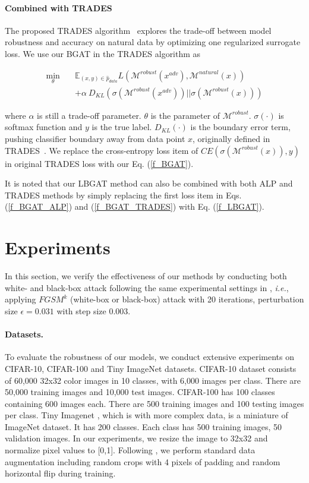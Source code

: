 \documentclass[10pt,twocolumn,letterpaper]{article}
\begin{document}
\paragraph{Combined with TRADES}
The proposed TRADES algorithm~\cite{zhang2019theoretically} explores the trade-off between model robustness and accuracy on natural data by optimizing one regularized surrogate loss. We use our BGAT in the TRADES algorithm as
\begin{small}
	\begin{align}
	\mathop{\min}_{\theta} \quad & \mathbb{E}_{(x,y) \in \hat{p}_{data}} L\left(\mathcal{M}^{robust}(x^{adv}), \mathcal{M}^{natural}(x)\right) \nonumber \\
	&+ \alpha~D_{KL}\left(\sigma(\mathcal{M}^{robust}(x^{adv})) || \sigma(\mathcal{M}^{robust}(x))\right) \label{f_BGAT_TRADES}
	\end{align}
\end{small}
where $\alpha$ is still a trade-off parameter.  $\theta$ is the parameter of $\mathcal{M}^{robust}$. $\sigma(\cdot)$ is softmax function and $y$ is the true label. $D_{KL}(\cdot)$ is the boundary error term, pushing classifier boundary away from data point $x$, originally defined in TRADES~\cite{zhang2019theoretically}. We replace the cross-entropy loss item of  $CE(\sigma(\mathcal{M}^{robust}(x)),y)$ in original TRADES loss with our Eq. (\ref{f_BGAT}). 


It is noted that our LBGAT method can also be combined with both ALP and TRADES methods by simply replacing the first loss item in Eqs. (\ref{f_BGAT_ALP}) and (\ref{f_BGAT_TRADES}) with Eq. (\ref{f_LBGAT}).

\section{Experiments}
\label{exp_evaluation}
In this section, we verify the effectiveness of our methods by conducting both white- and black-box attack following the same experimental settings in \cite{zhang2019theoretically}, {\it i.e.}, applying $FGSM^{k}$ (white-box or black-box) attack with 20 iterations, perturbation size $\epsilon=0.031$  with step size 0.003.

\paragraph{Datasets.}
To evaluate the robustness of our models, we conduct extensive experiments on CIFAR-10, CIFAR-100 and Tiny ImageNet datasets. CIFAR-10 dataset consists of 60,000 32x32 color images in 10 classes, with 6,000 images per class. There are 50,000 training images and 10,000 test images. 
CIFAR-100 has 100 classes containing 600 images each. There are 500 training images and 100 testing images per class. 
Tiny Imagenet \cite{DBLP:conf/cvpr/DengDSLL009}, which is with more complex data, is a miniature of ImageNet dataset. It has 200 classes. Each class has 500 training images, 50 validation images. In our experiments, we resize the image to 32x32 and normalize pixel values to [0,1].
Following \cite{zhang2019theoretically}, we perform standard data augmentation including random crops with 4 pixels of padding and random horizontal flip during training.
\end{document}
